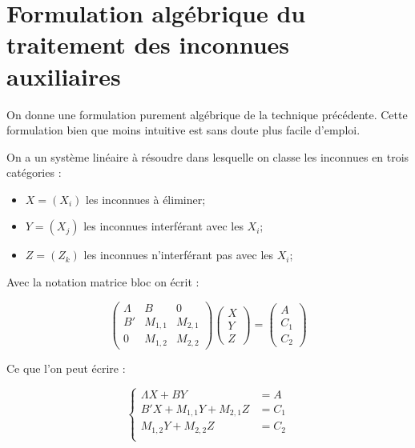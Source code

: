 
\section{Formulation alg\'ebrique du traitement des inconnues auxiliaires}


On donne une formulation purement alg\'ebrique de la technique pr\'ec\'edente.
Cette formulation bien que moins intuitive est sans doute plus facile
d'emploi.

On a un syst\`eme lin\'eaire \`a r\'esoudre dans lesquelle on classe
les inconnues en trois cat\'egories :

\begin{itemize}
   \item    $X=(X_i)$ les inconnues \`a \'eliminer;
   \item    $Y=(X_j)$ les inconnues interf\'erant avec les $X_i$;
   \item    $Z=(Z_k)$ les inconnues n'interf\'erant pas avec les $X_i$;
\end{itemize}

Avec la notation matrice bloc on \'ecrit :

\begin{equation}
 \begin{pmatrix}  \Lambda &  B & 0 \\ 
                 B' &    M_{1,1} & M_{2,1}  \\    
	         0     &  M_{1,2} &  M_{2,2}
  \end{pmatrix}
   \begin{pmatrix} X \\ Y \\ Z \end{pmatrix}
   = \begin{pmatrix} A \\ C_1 \\  C_2 \end{pmatrix}
\end{equation}

Ce que l'on peut \'ecrire :

\begin{equation}
 \begin{cases}  
          \Lambda X + B Y & = A   \\
	    B'X +  M_{1,1}Y +  M_{2,1} Z & = C_1 \\
	           M_{1,2}Y +  M_{2,2} Z & = C_2 \\
  \end{cases}
\end{equation}

